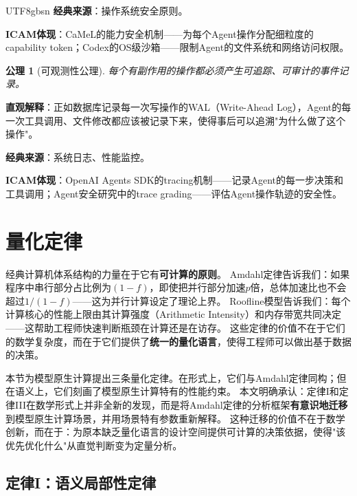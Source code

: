 \documentclass[11pt,a4paper]{article}
\newtheorem{axiom}{公理}[section]
\begin{document}
\begin{CJK*}{UTF8}{gbsn}
\textbf{经典来源}：操作系统安全原则\cite{ostep_2023}。

\textbf{ICAM体现}：CaMeL的能力安全机制\cite{debenedetti2025camel}——为每个Agent操作分配细粒度的capability token；Codex的OS级沙箱\cite{openai_codex_security_2026}——限制Agent的文件系统和网络访问权限。

\begin{axiom}[可观测性公理]
每个有副作用的操作都必须产生可追踪、可审计的事件记录。
\end{axiom}

\textbf{直观解释}：正如数据库记录每一次写操作的WAL（Write-Ahead Log），Agent的每一次工具调用、文件修改都应该被记录下来，使得事后可以追溯"为什么做了这个操作"。

\textbf{经典来源}：系统日志、性能监控\cite{linux_cgroup_2026}。

\textbf{ICAM体现}：OpenAI Agents SDK的tracing机制\cite{openai_codex_agentsdk_2026}——记录Agent的每一步决策和工具调用；Agent安全研究中的trace grading\cite{agenticsecurity2025}——评估Agent操作轨迹的安全性。

\section{量化定律}
\label{sec:laws}

经典计算机体系结构的力量在于它有\textbf{可计算的原则}。
Amdahl定律告诉我们：如果程序中串行部分占比例为$(1-f)$，即使把并行部分加速$p$倍，总体加速比也不会超过$1/(1-f)$——这为并行计算设定了理论上界\cite{hennessy2017quantitative}。
Roofline模型告诉我们：每个计算核心的性能上限由其计算强度（Arithmetic Intensity）和内存带宽共同决定——这帮助工程师快速判断瓶颈在计算还是在访存\cite{hennessy2017quantitative}。
这些定律的价值不在于它们的数学复杂度，而在于它们提供了\textbf{统一的量化语言}，使得工程师可以做出基于数据的决策。

本节为模型原生计算提出三条量化定律。在形式上，它们与Amdahl定律同构；但在语义上，它们刻画了模型原生计算特有的性能约束。
本文明确承认：定律I和定律III在数学形式上并非全新的发现，而是将Amdahl定律的分析框架\textbf{有意识地迁移}到模型原生计算场景，并用场景特有参数重新解释。
这种迁移的价值不在于数学创新，而在于：为原本缺乏量化语言的设计空间提供可计算的决策依据，使得"该优先优化什么"从直觉判断变为定量分析。

\subsection{定律I：语义局部性定律}
\label{sec:law1}


\end{CJK*}
\end{document}
